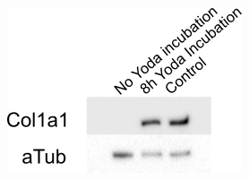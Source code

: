 \begin{figure}
	\centering
	\includegraphics[width = \linewidth{}]{Inkubationshypothese.png}
	\caption{}
	\label{fig:Inkubationshypothese_Western}
\end{figure}